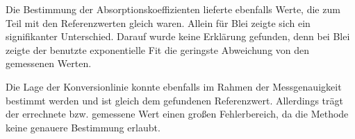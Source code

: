 \documentclass[
	parskip=half,10pt,
	numbers= noenddot, %
	toc=flat, %
	oneside,
	twocolumn,
	]{scrartcl}
\begin{document}
Die Bestimmung der Absorptionskoeffizienten lieferte ebenfalls Werte, die zum Teil mit den Referenzwerten gleich waren. Allein für Blei zeigte sich ein 
signifikanter Unterschied. Darauf wurde keine Erklärung gefunden, denn bei Blei zeigte der benutzte exponentielle Fit die geringste Abweichung von 
den gemessenen Werten. 

Die Lage der Konversionlinie konnte ebenfalls im Rahmen der Messgenauigkeit bestimmt werden und ist gleich dem gefundenen Referenzwert. Allerdings 
trägt der errechnete bzw. gemessene Wert einen großen Fehlerbereich, da die Methode keine genauere Bestimmung erlaubt. 

\onecolumn
\newpage




\FloatBarrier

\newpage
\end{document}
